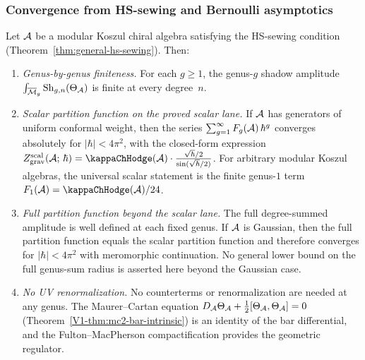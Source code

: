 \subsubsection{Convergence from HS-sewing and Bernoulli asymptotics}

\begin{theorem}
\label{thm:thqg-I-perturbative-finiteness}
Let $\mathcal{A}$ be a modular Koszul chiral algebra satisfying the HS-sewing condition \textup{(}Theorem~\textup{\ref{thm:general-hs-sewing})}. Then:
\begin{enumerate}[label=\textup{(\roman*)}]
\item \emph{Genus-by-genus finiteness.} For each $g \geq 1$, the genus-$g$ shadow amplitude $\int_{\overline{\mathcal{M}}_g} \operatorname{Sh}_{g,n}(\Theta_{\mathcal{A}})$ is finite at every degree~$n$.
\item \emph{Scalar partition function on the proved scalar lane.} If $\mathcal{A}$ has generators of uniform conformal weight, then the series $\sum_{g=1}^{\infty} F_g(\mathcal{A})\,\hbar^g$ converges absolutely for $|\hbar| < 4\pi^2$, with the closed-form expression $Z_{\mathrm{grav}}^{\mathrm{scal}}(\cA;\,\hbar) = \kappaChHodge(\cA) \cdot \frac{\sqrt{\hbar}/2}{\sin(\sqrt{\hbar}/2)}$. For arbitrary modular Koszul algebras, the universal scalar statement is the finite genus-$1$ term $F_1(\cA)=\kappaChHodge(\cA)/24$.
\item \emph{Full partition function beyond the scalar lane.} The full degree-summed amplitude is well defined at each fixed genus. If $\mathcal{A}$ is Gaussian, then the full partition function equals the scalar partition function and therefore converges for $|\hbar| < 4\pi^2$ with meromorphic continuation. No general lower bound on the full genus-sum radius is asserted here beyond the Gaussian case.
\item \emph{No UV renormalization.} No counterterms or renormalization are needed at any genus. The Maurer--Cartan equation $D_{\mathcal{A}}\Theta_{\mathcal{A}} + \tfrac{1}{2}[\Theta_{\mathcal{A}},\Theta_{\mathcal{A}}] = 0$ (Theorem~\ref*{V1-thm:mc2-bar-intrinsic}) is an identity of the bar differential, and the Fulton--MacPherson compactification provides the geometric regulator.
\end{enumerate}
\end{theorem}

